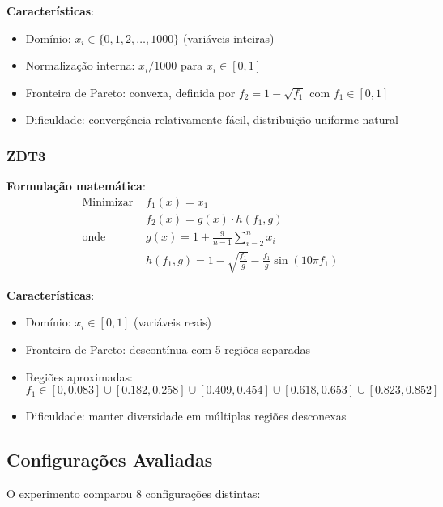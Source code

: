 \textbf{Características}:
\begin{itemize}
    \item Domínio: $x_i \in \{0, 1, 2, \ldots, 1000\}$ (variáveis inteiras)
    \item Normalização interna: $x_i / 1000$ para $x_i \in [0, 1]$
    \item Fronteira de Pareto: convexa, definida por $f_2 = 1 - \sqrt{f_1}$ com $f_1 \in [0, 1]$
    \item Dificuldade: convergência relativamente fácil, distribuição uniforme natural
\end{itemize}

\subsubsection{ZDT3}

\textbf{Formulação matemática}:
\begin{align*}
\text{Minimizar } & f_1(x) = x_1 \\
                  & f_2(x) = g(x) \cdot h(f_1, g) \\
\text{onde } & g(x) = 1 + \frac{9}{n-1}\sum_{i=2}^{n} x_i \\
             & h(f_1, g) = 1 - \sqrt{\frac{f_1}{g}} - \frac{f_1}{g}\sin(10\pi f_1)
\end{align*}

\textbf{Características}:
\begin{itemize}
    \item Domínio: $x_i \in [0, 1]$ (variáveis reais)
    \item Fronteira de Pareto: descontínua com 5 regiões separadas
    \item Regiões aproximadas: $f_1 \in [0, 0.083] \cup [0.182, 0.258] \cup [0.409, 0.454] \cup [0.618, 0.653] \cup [0.823, 0.852]$
    \item Dificuldade: manter diversidade em múltiplas regiões desconexas
\end{itemize}

\subsection{Configurações Avaliadas}

O experimento comparou 8 configurações distintas:

